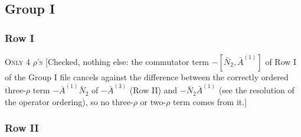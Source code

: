 \documentclass[9pt]{article}
\numberwithin{equation}{section}
\begin{document}
\subsection{Group I}
\subsubsection{Row I}
\textsc{Only 4 $\rho$'s} {\color{red}[Checked, nothing else: the commutator term $-[\bar N_{2},\bar A^{(1)}]$ of Row I of the Group I file cancels against the difference between the correctly ordered three-$\rho$ term $-\bar A^{(1)}\bar N_{2}$ of $-\bar A^{(3)}$ (Row II) and $-\bar N_{2}\bar A^{(1)}$ (see the resolution of the operator ordering), so no three-$\rho$ or two-$\rho$ term comes from it.]}
\subsubsection{Row II}
\end{document}
